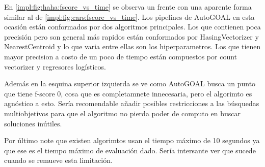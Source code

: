 En \ref{impl:fig:haha:fscore_vs_time} se observa un frente con una aparente forma similar al de \ref{impl:fig:cars:fscore_vs_time}. Los pipelines de AutoGOAL en esta ocasi\'on est\'an conformados por dos algoritmos principales. Los que contienen poca precisi\'on pero son general m\'as rapidos est\'an conformados por HasingVectorizer y NearestCentroid y  lo que varia entre ellas son los hiperparametros. Los que tienen mayor precision a costo de un poco de tiempo est\'an compuestos por count vectorizer  y regresores log\'isticos.

Adem\'as en la esquina superior izquierda se ve como AutoGOAL busca un punto que tiene f-score 0, cosa que es completamnete innecesaria, pero el algorimto es agn\'ostico a esto. Ser\'ia recomendable añadir posibles restricciones a las b\'usquedas multiobjetivos para que el algoritmo no pierda poder de computo en buscar soluciones in\'utiles.

Por \'ultimo note que existen algorimtos usan el tiempo m\'aximo de 10 segundos ya que ese es el tiempo m\'aximo de evaluaci\'on dado. Ser\'ia intersante ver que sucede cuando se remueve esta limitaci\'on.

